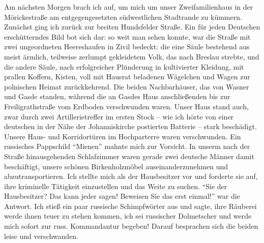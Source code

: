 Am nächsten Morgen brach ich auf, um mich um unser Zweifamilienhaus in der Mörickestraße am entgegengesetzten südwestlichen Stadtrande zu kümmern. Zunächst ging ich zurück zur breiten Hundsfelder Straße. Ein für jeden Deutschen erschütterndes Bild bot sich dar: so weit man sehen konnte, war die Straße mit zwei ungeordneten Heereshaufen in Zivil bedeckt: die eine Säule bestehend aus meist ärmlich, teilweise zerlumpt gekleidetem Volk, das nach Breslau strebte, und die andere Säule, nach erfolgreicher Plünderung in kultivierter Kleidung, mit prallen Koffern, Kisten, voll mit Hausrat beladenen Wägelchen und Wagen zur polnischen Heimat zurückkehrend. Die beiden Nachbarhäuser, das von Wasner und Gasde standen, während die an Gasdes Haus anschließenden bis zur Freiligrathstraße vom Erdboden verschwunden waren. Unser Haus stand auch, zwar durch zwei Artillerietreffer im ersten Stock -- wie ich hörte von einer deutschen in der Nähe der Johanniskirche postierten Batterie -- stark beschädigt. Unsere Haus- und Korridortüren im Hochparterre waren verschwunden. Ein russisches Pappschild \enquote{Mienen} mahnte mich zur Vorsicht.  In unserm nach der Straße hinausgehenden Schlafzimmer waren gerade zwei deutsche Männer damit beschäftigt, unsere schönen Birkenholzmöbel auseinanderzunehmen und abzutransportieren. Ich stellte mich als der Hausbesitzer vor und forderte sie auf, ihre kriminelle Tätigkeit einzustellen und das Weite zu suchen. \enquote{Sie der Hausbesitzer? Das kann jeder sagen! Beweisen Sie das erst einmal!} war die Antwort. Ich stieß ein paar russische Schimpfwörter aus und sagte, ihre Räuberei werde ihnen teuer zu stehen kommen, ich sei russischer Dolmetscher und werde mich sofort zur russ. Kommandantur begeben! Darauf besprachen sich die beiden leise und verschwanden.

